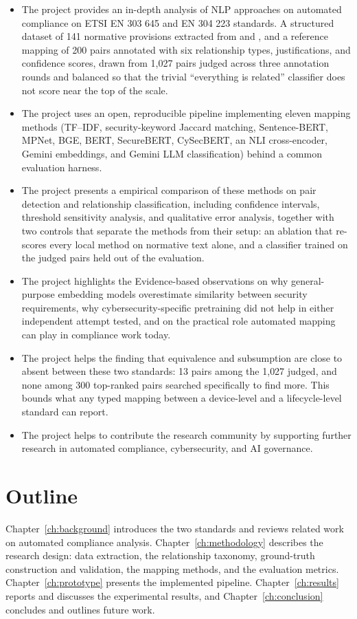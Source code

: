 \begin{itemize}
  \item The project provides an in-depth analysis of NLP approaches on automated compliance on ETSI EN 303 645 and EN 304 223 standards. A structured dataset of 141 normative provisions extracted from
  \standardA{} and \standardB{}, and a reference mapping of 200 pairs annotated
  with six relationship types, justifications, and confidence scores, drawn from
  1{,}027 pairs judged across three annotation rounds and balanced so that the
  trivial ``everything is related'' classifier does not score near the top of
  the scale.
  \item The project uses an open, reproducible pipeline implementing eleven mapping methods
  (TF--IDF, security-keyword Jaccard matching, Sentence-BERT, MPNet, BGE, BERT,
  SecureBERT, CySecBERT, an NLI cross-encoder, Gemini embeddings, and Gemini LLM
  classification) behind a common evaluation harness.
  \item The project presents a empirical comparison of these methods on pair detection and
  relationship classification, including confidence intervals, threshold
  sensitivity analysis, and qualitative error analysis, together with two
  controls that separate the methods from their setup: an ablation that
  re-scores every local method on normative text alone, and a classifier trained
  on the judged pairs held out of the evaluation.
  \item The project highlights the Evidence-based observations on why general-purpose embedding models
  overestimate similarity between security requirements, why cybersecurity-specific
  pretraining did not help in either independent attempt tested, and on the
  practical role automated mapping can play in compliance work today.
  \item The project helps the finding that equivalence and subsumption are close to absent between
  these two standards: 13 pairs among the 1{,}027 judged, and none among 300
  top-ranked pairs searched specifically to find more. This bounds what any typed
  mapping between a device-level and a lifecycle-level standard can report.
  \item The project helps to contribute the research community by supporting further research in automated compliance, cybersecurity, and AI governance.
\end{itemize}

\section{Outline}

Chapter~\ref{ch:background} introduces the two standards and reviews related
work on automated compliance analysis. Chapter~\ref{ch:methodology} describes
the research design: data extraction, the relationship taxonomy, ground-truth
construction and validation, the mapping methods, and the evaluation metrics.
Chapter~\ref{ch:prototype} presents the implemented pipeline.
Chapter~\ref{ch:results} reports and discusses the experimental results, and
Chapter~\ref{ch:conclusion} concludes and outlines future work.
